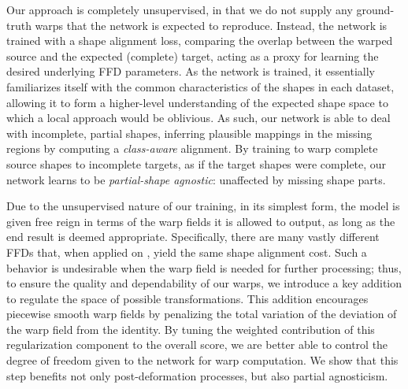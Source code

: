 \documentclass[acmtog,timestamp]{acmart}%
\begin{document}
Our approach is completely unsupervised, in that we do not supply any ground-truth warps that the network is expected to reproduce. Instead, the network is trained with a shape alignment loss, comparing the overlap between the warped source and the expected (complete) target, acting as a proxy for learning the desired underlying FFD parameters. As the network is trained, it essentially familiarizes itself with the common characteristics of the shapes in each dataset, allowing it to form a higher-level understanding of the expected shape space 
to which a local approach would be oblivious.
As such, our network is able to deal with incomplete, partial shapes, inferring plausible mappings in the missing regions by computing a \emph{class-aware} alignment. By training to warp complete source shapes to incomplete targets, as if the target shapes were complete, %
our network learns to be \emph{partial-shape agnostic}: unaffected by missing shape parts.

Due to the unsupervised nature of our training, in its simplest form, the model is given free reign in terms of the warp fields it is allowed to output, as long as the end result is deemed appropriate. 
Specifically, there are many vastly different FFDs that, when applied on , yield the same shape alignment cost.
Such a behavior is undesirable when the warp field is needed for further processing; thus, to ensure the quality and dependability of our warps, we introduce a key addition to regulate the space of possible transformations.
This addition encourages piecewise smooth warp fields by penalizing the total variation of the deviation of the warp field from the identity.
By tuning the weighted contribution of this regularization component to the overall score, we are better able to control the degree of freedom given to the network for warp computation. We show that this step benefits not only post-deformation processes, but also partial agnosticism.
\end{document}
